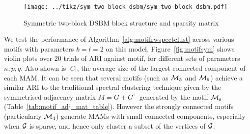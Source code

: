\begin{figure}[H]
	\centering
	\texttt{[image: ../tikz/sym\_two\_block\_dsbm/sym\_two\_block\_dsbm.pdf]}
	\caption{Symmetric two-block DSBM block structure and sparsity matrix}
	\label{fig:sym_two_block_dsbm}
\end{figure}


We test the performance of Algorithm~\ref{alg:motifrwspectclust} across various motifs with parameters $k=l=2$ on this model.
Figure~\ref{fig:motifsym} shows violin plots over 20 trials of ARI against motif, for different sets of parameters $n,p,q$.
Also shown is $|C|$, the average size of the largest connected component of each MAM.
It can be seen that several motifs (such as $\mathcal{M}_5$ and $\mathcal{M}_9$) achieve a similar ARI to the traditional spectral clustering technique given by the symmetrised adjacency matrix $M=G+G^\top$ generated by the motif $\mathcal{M}_\mathrm{s}$ (Table~\ref{tab:motif_adj_mat_table}).
However the strongly connected motifs (particularly $\mathcal{M}_4$) generate MAMs with small connected components, especially when $\mathcal{G}$ is sparse, and hence only cluster a subset of the vertices of $\mathcal{G}$.

